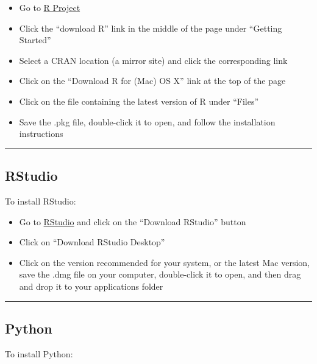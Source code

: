 \documentclass[]{book}
\providecommand{\tightlist}{%
  \setlength{\itemsep}{0pt}\setlength{\parskip}{0pt}}
\begin{document}
\begin{itemize}
\tightlist
\item
  Go to \href{http://www.r-project.org}{R Project}
\item
  Click the ``download R'' link in the middle of the page under ``Getting Started''
\item
  Select a CRAN location (a mirror site) and click the corresponding link
\item
  Click on the ``Download R for (Mac) OS X'' link at the top of the page
\item
  Click on the file containing the latest version of R under ``Files''
\item
  Save the .pkg file, double-click it to open, and follow the installation instructions
\end{itemize}

\begin{center}\rule{0.5\linewidth}{\linethickness}\end{center}

\hypertarget{rstudio}{%
\subsection{RStudio}\label{rstudio}}

To install RStudio:

\begin{itemize}
\tightlist
\item
  Go to \href{http://www.rstudio.com}{RStudio} and click on the ``Download RStudio'' button
\item
  Click on ``Download RStudio Desktop''
\item
  Click on the version recommended for your system, or the latest Mac version, save the .dmg file on your computer, double-click it to open, and then drag and drop it to your applications folder
\end{itemize}

\begin{center}\rule{0.5\linewidth}{\linethickness}\end{center}

\hypertarget{python}{%
\subsection{Python}\label{python}}

To install Python:
\end{document}
